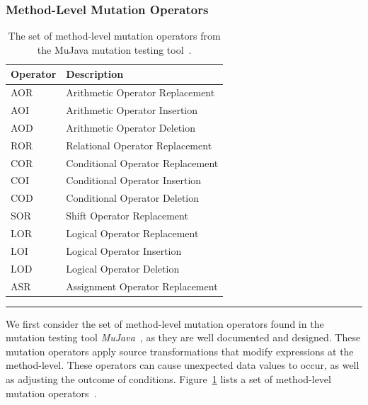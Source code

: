 \subsubsection{Method-Level Mutation Operators}
\label{subsubsec:background_method_operators}
\begin{table}[t!]
  \centering
  \begin{tabular}{|l|l|}
    \hline
    \rowcolor[RGB]{169,196,223}
    \textbf{Operator} & \textbf{Description} \\
    \hline AOR & Arithmetic Operator Replacement \\
    \hline AOI & Arithmetic Operator Insertion \\
    \hline AOD & Arithmetic Operator Deletion \\
    \hline ROR & Relational Operator Replacement \\
    \hline COR & Conditional Operator Replacement \\
    \hline COI & Conditional Operator Insertion \\
    \hline COD & Conditional Operator Deletion \\
    \hline SOR & Shift Operator Replacement \\
    \hline LOR & Logical Operator Replacement \\
    \hline LOI & Logical Operator Insertion \\
    \hline LOD & Logical Operator Deletion \\
    \hline ASR & Assignment Operator Replacement \\
    \hline
  \end{tabular}
  \caption{The set of method-level mutation operators from the MuJava mutation testing tool~\cite{MOK05, MO05a}.}
  \label{tab:method_operators}
  \vspace{2mm}
  \hrule
\end{table}

We first consider the set of method-level mutation operators found in the mutation testing tool \emph{MuJava}~\cite{MOK05}, as they are well documented and designed. These mutation operators apply source transformations that modify expressions at the method-level. These operators can cause unexpected data values to occur, as well as adjusting the outcome of conditions. Figure~\ref{tab:method_operators} lists a set of method-level mutation operators~\cite{MO05a}.

